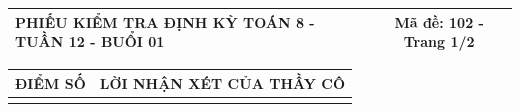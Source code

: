 \documentclass[12pt,a4paper]{article}
\begin{document}
\newpage
\noindent
\begin{tabularx}{\linewidth}{|X|c|}
\hline
\textbf{PHIẾU KIỂM TRA ĐỊNH KỲ TOÁN 8 - TUẦN 12 - BUỔI 01} & \textbf{Mã đề: 102 - Trang 1/2} \\
\hline
\end{tabularx}

\vspace{1.0mm}

\noindent
\begin{tabularx}{\linewidth}{|p{3.2cm}|X|}
\hline
\centering\textbf{ĐIỂM SỐ} & \centering\textbf{LỜI NHẬN XÉT CỦA THẦY CÔ} \tabularnewline
\hline
\rule{0pt}{1.8cm} & \tabularnewline
\hline
\end{tabularx}
\end{document}
